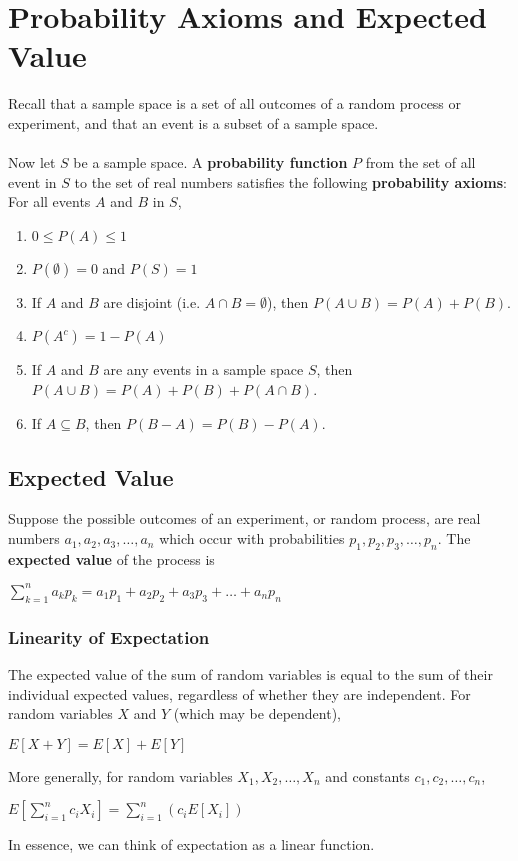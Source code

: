 \documentclass[a4paper]{article}
\begin{document}
\section{Probability Axioms and Expected Value}
Recall that a sample space is a set of all outcomes of a random process or experiment, and that an event is a subset of a sample space.\\\\
Now let $S$ be a sample space. A \textbf{probability function} $P$ from the set of all event in $S$ to the set of real numbers satisfies the following \textbf{probability axioms}: For all events $A$ and $B$ in $S$,
\begin{enumerate}
	\item $0\le P(A)\le 1$
	\item $P(\emptyset) = 0$ and $P(S) = 1$
	\item If $A$ and $B$ are disjoint (i.e. $A\cap B = \emptyset$), then $P(A\cup B) = P(A) + P(B)$.
	\item $P(A^c) = 1 - P(A)$
	\item If $A$ and $B$ are any events in a sample space $S$, then $P(A\cup B) = P(A) + P(B) + P(A\cap B)$.
	\item If $A\subseteq B$, then $P(B-A) = P(B) - P(A)$.
\end{enumerate}

\subsection{Expected Value}
Suppose the possible outcomes of an experiment, or random process, are real numbers $a_1, a_2, a_3, \dots, a_n$ which occur with probabilities $p_1, p_2, p_3, \dots, p_n$. The \textbf{expected value} of the process is
\begin{center}
	$\sum\limits_{k=1}^{n}a_kp_k=a_1p_1+a_2p_2+a_3p_3+\dots+a_np_n$
\end{center}
\subsubsection{Linearity of Expectation}
The expected value of the sum of random variables is equal to the sum of their individual expected values, regardless of whether they are independent. For random variables $X$ and $Y$ (which may be dependent),
\begin{center}
	$E[X+Y] = E[X] + E[Y]$
\end{center}
More generally, for random variables $X_1, X_2, \dots,X_n$ and constants $c_1, c_2,\dots,c_n$,
\begin{center}
	$E[\sum\limits_{i=1}^{n}c_iX_i] = \sum\limits_{i=1}^{n}(c_iE[X_i])$
\end{center}
In essence, we can think of expectation as a linear function.
\end{document}

